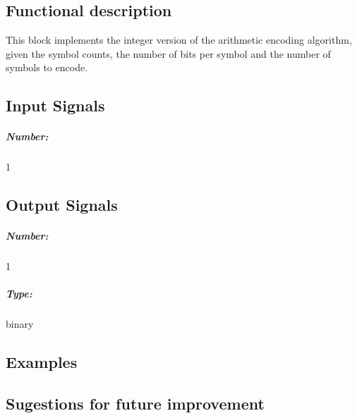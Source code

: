 \subsection*{Functional description}

This block implements the integer version of the arithmetic encoding algorithm, given the symbol counts, the number of bits per symbol and the number of symbols to encode.


\pagebreak
\subsection*{Input Signals}

\subparagraph*{Number:} 1

\subsection*{Output Signals}

\subparagraph*{Number:} 1

\subparagraph*{Type:} binary

\subsection*{Examples}

\subsection*{Sugestions for future improvement}


